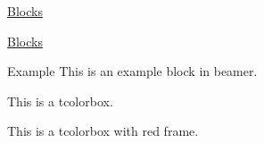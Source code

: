 \documentclass{ctexbeamer}
\begin{document}
\begin{frame}{\underline{Blocks}}
  \itshape\lipsum[3]
\end{frame}

\begin{frame}{\underline{Blocks}}
  \begin{exampleblock}{Example}
    This is an example block in beamer.
  \end{exampleblock}
  \begin{tcolorbox}
    This is a tcolorbox.
  \end{tcolorbox}
  \begin{tcolorbox}[colframe=purple!70,colback=red!10]
    This is a tcolorbox with red frame.
  \end{tcolorbox}
\end{frame}

\begin{frame}
  \begin{center}
    \Huge{}
  \end{center}
\end{frame}
\end{document}
